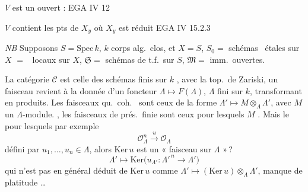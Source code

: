 \documentclass[11pt,a4paper]{article}
\begin{document}
$V$ est un ouvert : EGA IV 12

$V$ contient les pts de $X_y$ où $X_y$ est réduit EGA IV 15.2.3


\emph{NB} \struck{\ill{}} Supposons $S = \mathrm{Spec}\, k$,
\struck{\ill{}} $k$ corps alg.\ clos, et $X = S$,
\struck{\ill{} \ill{}} $S_0 =$ schémas \ étales sur $X$
$=$ \ locaux sur $X$,
$\mathfrak{S} =$ schémas de t.f.\ sur $S$,
$\mathfrak{M} =$ imm.\ ouvertes.

La catégorie $\mathcal{C}$ est celle des schémas \struck{\ill{}} finis
sur $k$ , avec la top.\ de Zariski, un
faisceau  revient à la donnée d'un  foncteur
$\Lambda \mapsto F(\Lambda)$, $\Lambda$ fini sur $k$, transformant
\ill{} \ill{} en produits. Les faisceaux qu.\ coh.\  sont ceux \ill{} \struck{\ill{}} de la
forme $\Lambda' \mapsto M \otimes_\Lambda \Lambda'$, avec $M$ un
$\Lambda$-module. \struck{\ill{}} , les faisceaux
de prés.\ finie sont ceux pour lesquels \struck{\ill{}} $M$ . Mais \ill{} le \ill{} \ill{} pour lesquels \ill{} \ill{} \ill{}
\ill{} \ill{}  par exemple
\[
  \mathcal{O}_\Lambda^n \xrightarrow{\ u\ } \mathcal{O}_\Lambda
\]
défini par \struck{\ill{}} $u_1, \ldots, u_n \in \Lambda$, alors
$\mathrm{Ker}\, u$ est un « faisceau sur 
$\Lambda$ »\,?
\[
  \Lambda' \mapsto \mathrm{Ker}\bigl(u_{\Lambda'} \colon
  \Lambda'^{\,n} \to \Lambda'\bigr)
\]
qui n'est pas en général déduit de $\mathrm{Ker}\, u$ comme
$\Lambda' \mapsto (\mathrm{Ker}\, u) \otimes_\Lambda \Lambda'$,
manque de platitude \ldots

\end{document}
